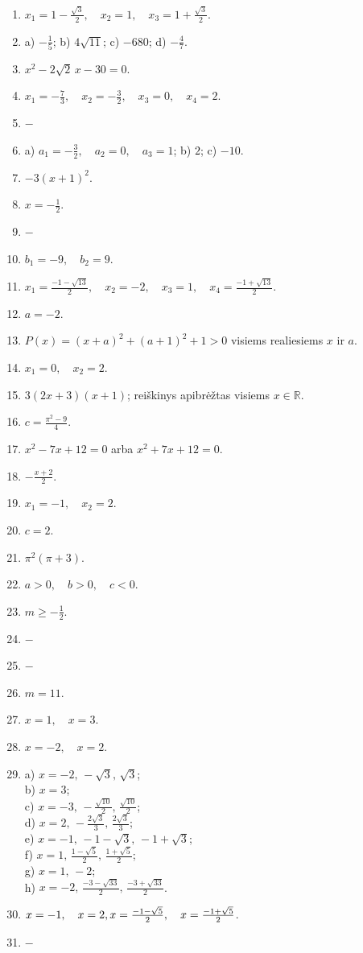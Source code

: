 \documentclass[11pt,a4paper]{scrartcl}
\begin{document}
\begin{enumerate}
    \item $x_1=1-\frac{\sqrt{3}}{2},\quad x_2=1,\quad
    x_3=1+\frac{\sqrt{3}}{2}$.
    \item a) $-\frac15$; b) $4\sqrt{11}$; c) $-680$; d) $-\frac47$.
    \item $x^2-2\sqrt{2}\,x-30=0$.
    \item $x_1=-\frac73,\quad x_2=-\frac32,\quad x_3=0,\quad x_4=2$.
    \item $- $
    \item a) $a_1=-\frac32,\quad a_2=0,\quad a_3=1$;
    b) $2$; c) $-10$.
    \item $-3(x+1)^2$.
    \item $x=-\frac12$.
    \item $-$
    \item $b_1=-9,\quad b_2=9$.
    \item $x_1=\frac{-1-\sqrt{13}}2,\quad x_2=-2,\quad
    x_3=1,\quad x_4=\frac{-1+\sqrt{13}}2$.
    \item $a=-2$.
    \item $P(x)=(x+a)^2+(a+1)^2+1>0$ visiems realiesiems $x$ ir $a$.
    \item $x_1=0,\quad x_2=2$.
    \item $3(2x+3)(x+1)$; reiškinys apibrėžtas visiems $x\in\mathbb R$.
    \item $c=\frac{\pi^2-9}{4}$.
    \item $x^2-7x+12=0$ arba $x^2+7x+12=0$.
    \item $-\frac{x+2}{2}$.
    \item $x_1=-1,\quad x_2=2$.
    \item $c=2$.
    \item $\pi^2(\pi+3)$.
    \item $a>0,\quad b>0,\quad c<0$.
    \item $m\ge-\frac12$.
    \item $-$
    \item $-$
    \item $m=11$.
    \item $x=1,\quad x=3$.
    \item $x=-2,\quad x=2$.
    \item 
    a) $x=-2,\,-\sqrt3,\,\sqrt3$; \\
    b) $x=3$;\\
    c) $x=-3,\,-\frac{\sqrt{10}}2,\,\frac{\sqrt{10}}2$;\\
    d) $x=2,\,-\frac{2\sqrt3}{3},\,\frac{2\sqrt3}{3}$;\\
    e) $x=-1,\,-1-\sqrt3,\,-1+\sqrt3$;\\
    f) $x=1,\,\frac{1-\sqrt5}{2},\,\frac{1+\sqrt5}{2}$;\\
    g) $x=1,\,-2$;\\
    h) $x=-2,\,\frac{-3-\sqrt{33}}2,\,\frac{-3+\sqrt{33}}2$.\\
    \item $x=-1,\quad x=2,\quad\\
    x=\frac{-1-\sqrt5}{2},\quad x=\frac{-1+\sqrt5}{2}$.\\
    \item $-$
\end{enumerate}
\end{document}

